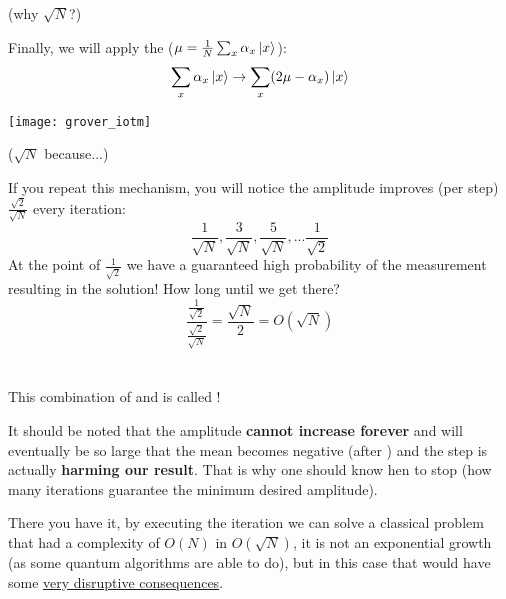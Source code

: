\documentclass[aspectratio=43]{beamer}
\begin{document}
\begin{frame}{\gvsa (why $\sqrt{N}$?)}
    \begin{cardTiny}
        Finally, we will apply the \iatm ($\mu = \frac{1}{N}\sum_x \alpha_x \ket{x}$):
        \begin{equation*}
            \sum_x \alpha_x \ket{x} \rightarrow \sum_x (2\mu - \alpha_x) \ket{x}
        \end{equation*}
        \begin{center}
            \texttt{[image: grover\_iotm]}
        \end{center}
    \end{cardTiny}
\pagenumber
\end{frame}

\newcommand{\amp}[2]{\frac{#1}{\sqrt{#2}}}
\begin{frame}{\gvsa ($\sqrt{N}$ because...)}
    \begin{card}
        If you repeat this mechanism, you will notice the amplitude improves (per step) $\amp{\sqrt{2}}{N}$ every iteration:
        \begin{equation*}
            \amp{1}{N}, \amp{3}{N}, \amp{5}{N}, ... \amp{1}{2}
        \end{equation*}
        At the point of $\amp{1}{2}$ we have a guaranteed high probability of the measurement resulting in the solution! How long until we get there?
        \begin{equation*}
            \frac{\amp{1}{2}}{\amp{\sqrt{2}}{N}} = \frac{\sqrt{N}}{2} = O(\sqrt{N})
        \end{equation*}
    \end{card}
\pagenumber
\end{frame}

\section{\aamp}
\begin{frame}{\aamp}
    \begin{cardTiny}
        This combination of \phiv and \iatm is called \textbf{\aamp}!
    \end{cardTiny}
    \begin{cardTiny}
        \small{
        It should be noted that the amplitude \textbf{cannot increase forever} and will eventually be so large that the mean becomes negative (after \phiv) and the \iatm step is actually \textbf{harming our result}. That is why one should know hen to stop (how many iterations guarantee the minimum desired amplitude).}
    \end{cardTiny}
    \begin{cardTiny}
        There you have it, by executing the \aamp iteration we can solve a classical problem that had a complexity of $O(N)$ in $O(\sqrt{N})$, it is not an exponential growth (as some quantum algorithms are able to do), but in this case that would have some \href{https://en.wikipedia.org/wiki/P_versus_NP_problem}{very disruptive consequences}.
    \end{cardTiny}
\pagenumber
\end{frame}
\end{document}
